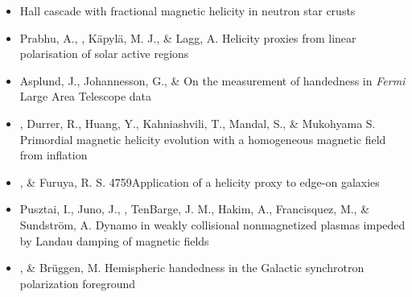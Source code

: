 \begin{itemize}
\item[{408.}~]
\Brandenburg{}
{Hall cascade with fractional magnetic helicity in neutron star crusts}

\item[{407.}~]
Prabhu, A., \Brandenburg, K\"apyl\"a, M. J., \& Lagg, A.
{Helicity proxies from linear polarisation of solar active regions}

\item[{406.}~]
Asplund, J., Johannesson, G., \& \Brandenburg{}
{On the measurement of handedness in {\em Fermi} Large Area Telescope data}

\item[{405.}~]
\Brandenburg, Durrer, R., Huang, Y., Kahniashvili, T., Mandal, S., \& Mukohyama S.
{Primordial magnetic helicity evolution with a homogeneous magnetic field from inflation}

\item[{404.}~]
\Brandenburg, \& Furuya, R. S.
{4759}{Application of a helicity proxy to edge-on galaxies}

\item[{403.}~]
Pusztai, I., Juno, J., \Brandenburg, TenBarge, J. M., Hakim, A., Francisquez, M., \& Sundstr\"{o}m, A.
{Dynamo in weakly collisional nonmagnetized plasmas impeded by Landau damping of magnetic fields}

\item[{402.}~]
\Brandenburg, \& Br\"uggen, M.
{Hemispheric handedness in the Galactic synchrotron polarization foreground}


\end{itemize}

